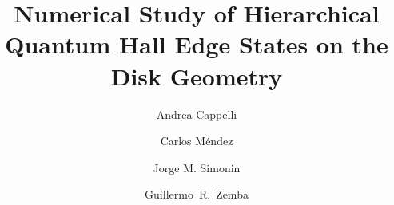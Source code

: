 \def\beq{\begin{equation}}
\def\eeq{\end{equation}}
\def\barr{\begin{eqnarray}}
\def\earr{\end{eqnarray}}
\def\winf{W_{1+\infty}\ }
\def\u1{\widehat{U(1)}}
\def\su2{\widehat{SU(2)}_1}
\def\suem{\widehat{SU(m)}_1}
\def\rep{representation }
\def\reps{representations }
\def\scr{\scriptstyle}
\def\disp{\displaystyle}
\def\und{\underline}
\def\I{{\rm Im}\ }
\def\R{{\rm Re}\ }
\def\Z{{\bf Z}}
\def\rr{\rangle\rangle}
\newcommand{\nl}{\nonumber \\}
\newcommand{\al}{\alpha}
\newcommand{\be}{\beta}
\newcommand{\ga}{\gamma}
\newcommand{\de}{\delta}
\newcommand{\ep}{\epsilon}
\newcommand{\ri}{\rm i}
\newcommand{\re}{\rm e}

%



\title{Numerical Study of Hierarchical Quantum Hall
Edge States on the Disk Geometry}
 
\author{Andrea Cappelli}
\address{I.N.F.N. and Dipartimento di Fisica,
         Largo E. Fermi 2,
         I-50125 Firenze, Italy}
\author{Carlos M\'endez}
\address{Departamento de F\'{\i}sica, Pontif\'{\i}cia Universidade
Cat\'olica, C.P. 38071, 22452-970 Rio de Janeiro,RJ, Brazil} 
\author{Jorge M. Simonin}
\address{Centro At\'omico Bariloche, Comisi\'on Nacional de
         Energ\'{\i}a At\'omica and
         Instituto Balseiro, Universidad Nacional 
         de Cuyo
         8400 -  San Carlos de Bariloche
         R\'{\i}o Negro, Argentina}
\author{Guillermo~R.~Zemba}
\address{Centro At\'omico Bariloche, Comisi\'on Nacional de
         Energ\'{\i}a At\'omica and
         Instituto Balseiro, Universidad Nacional de Cuyo
         8400 -  San Carlos de Bariloche
         R\'{\i}o Negro, Argentina}
 
\maketitle

